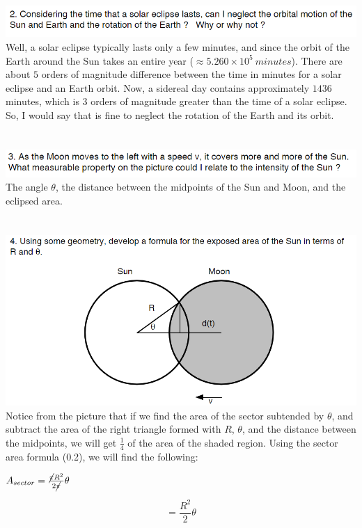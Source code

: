 \documentclass{article}
\begin{document}
\section{}
\includegraphics[scale = 0.8]{projectq2.PNG}
Well, a solar eclipse typically lasts only a few minutes, and since the orbit of the Earth around the Sun takes an entire year ($\approx 5.260\times10^5 \:minutes$). There are about $5$ orders of magnitude difference between the time in minutes for a solar eclipse and an Earth orbit. Now, a sidereal day contains approximately $1436$ minutes, which is $3$ orders of magnitude greater than the time of a solar eclipse. So, I would say that is fine to neglect the rotation of the Earth and its orbit.


\section{}
\includegraphics[scale = 0.8]{projectq3.PNG}
The angle $\theta$, the distance between the midpoints of the Sun and Moon, and the eclipsed area.

\section{}
\includegraphics[scale = 0.8]{projectq4.PNG}
Notice from the picture that if we find the area of the sector subtended by $\theta$, and subtract the area of the right triangle formed with $R$, $\theta$, and the distance between the midpoints, we will get $\frac{1}{4}$ of the area of the shaded region.
\newline
Using the sector area formula (0.2), we will find the following:
\begin{center}
    $A_{sector} = \frac{\cancel{\pi} R^2}{2\cancel{\pi}}\theta$
\end{center}
\begin{equation}
    = \frac{R^2}{2}\theta
\end{equation}
\end{document}
